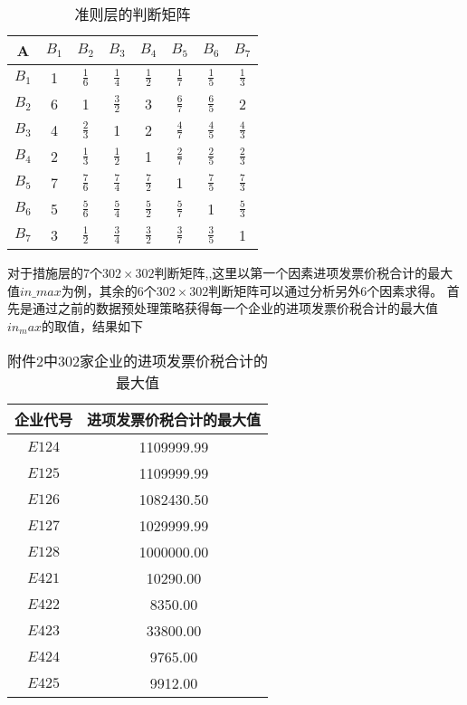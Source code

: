 \documentclass{cumcmthesis}
\begin{document}
\begin{table}[H]
    \centering
    \begin{tabular}{|c|ccccccc|}%
    \hline
        A & $B_1$ & $B_2$ & $B_3$ & $B_4$ & $B_5$ & $B_6$ & $B_7$   \\
    \hline 
    $B_1$  &  1   &$\frac{1}{6}$  &$\frac{1}{4}$  &$\frac{1}{2}$  &$\frac{1}{7}$  &$\frac{1}{5}$  &$\frac{1}{3}$\\
    $B_2$  &  6   &1              &$\frac{3}{2}$  &3              &$\frac{6}{7}$  &$\frac{6}{5}$  &2\\
    $B_3$  &  4   &$\frac{2}{3}$  &1              &2              &$\frac{4}{7}$  &$\frac{4}{5}$  &$\frac{4}{3}$\\
    $B_4$  &  2   &$\frac{1}{3}$  &$\frac{1}{2}$  &1              &$\frac{2}{7}$  &$\frac{2}{5}$  &$\frac{2}{3}$\\
    $B_5$  &  7   &$\frac{7}{6}$  &$\frac{7}{4}$  &$\frac{7}{2}$  &1              &$\frac{7}{5}$  &$\frac{7}{3}$\\
    $B_6$  &  5   &$\frac{5}{6}$  &$\frac{5}{4}$  &$\frac{5}{2}$  &$\frac{5}{7}$  &1              &$\frac{5}{3}$\\
    $B_7$  &  3   &$\frac{1}{2}$  &$\frac{3}{4}$  &$\frac{3}{2}$  &$\frac{3}{7}$  &$\frac{3}{5}$  &1\\
    \hline
\end{tabular}
    \caption{准则层的判断矩阵}
    \label{tablejudge}
\end{table}
对于措施层的7个$302 \times 302$判断矩阵,,这里以第一个因素进项发票价税合计的最大值$in\_max$为例，其余的6个$302\times 302$判断矩阵可以通过分析另外6个因素求得。
首先是通过之前的数据预处理策略获得每一个企业的进项发票价税合计的最大值$in_max$的取值，结果如下

\begin{table}[H]
    
    \label{tablesymbol}
    \centering
    \begin{tabular}{|c|c|}   
    \hline
    企业代号 & 进项发票价税合计的最大值 \\
    \hline 
    $E124$  &  1109999.99\\
    $E125$  &  1109999.99\\
    $E126$  &  1082430.50\\
    $E127$  &  1029999.99\\
    $E128$  &  1000000.00\\
         
    $E421$  &    10290.00\\
    $E422$  &     8350.00\\
    $E423$  &    33800.00\\
    $E424$  &     9765.00\\
    $E425$  &     9912.00\\
    \hline
    \end{tabular}
    \caption{附件2中302家企业的进项发票价税合计的最大值}
    \label{table2}
\end{table}
\end{document}
